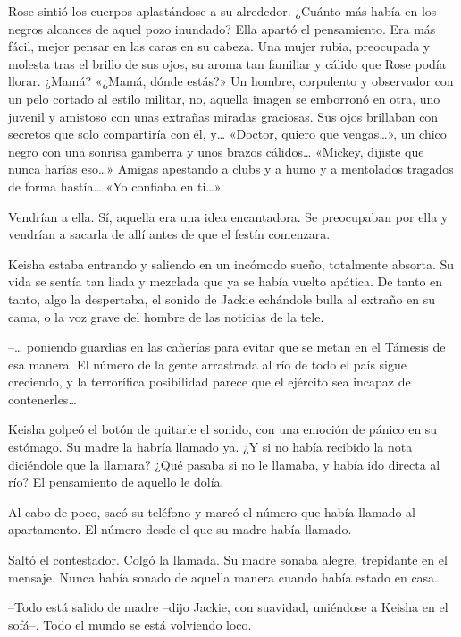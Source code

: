 {Rose sintió los cuerpos aplastándose a su alrededor. ¿Cuánto más había
 en los negros alcances de aquel pozo inundado? Ella apartó el
 pensamiento. Era más fácil, mejor pensar en las caras en su cabeza. Una
 mujer rubia, preocupada y molesta tras el brillo de sus ojos, su aroma
 tan familiar y cálido que Rose podía llorar. ¿Mamá? «¿Mamá, dónde
 estás?» Un hombre, corpulento y observador con un pelo cortado al estilo
 militar, no, aquella imagen se emborronó en otra, uno juvenil y amistoso
 con unas extrañas miradas graciosas. Sus ojos brillaban con secretos que
 solo compartiría con él, y\ldots{} «Doctor, quiero que vengas\ldots{}»,
 un chico negro con una sonrisa gamberra y unos brazos cálidos\ldots{}
 «Mickey, dijiste que nunca harías eso\ldots{}» Amigas apestando a clubs
 y a humo y a mentolados tragados de forma hastía\ldots{} «Yo confiaba en
 ti\ldots{}»}

{Vendrían a ella. Sí, aquella era una idea encantadora. Se preocupaban
por ella y vendrían a sacarla de allí antes de que el festín comenzara.}

\mbox{}

{Keisha estaba entrando y saliendo en un incómodo sueño, totalmente
 absorta. Su vida se sentía tan liada y mezclada que ya se había vuelto
 apática. De tanto en tanto, algo la despertaba, el sonido de Jackie
 echándole bulla al extraño en su cama, o la voz grave del hombre de las
noticias de la tele.}

{--\ldots{} poniendo guardias en las cañerías para evitar que se metan
 en el Támesis de esa manera. El número de la gente arrastrada al río de
 todo el país sigue creciendo, y la terrorífica posibilidad parece que el
 ejército sea incapaz de contenerles\ldots{}}

{Keisha golpeó el botón de quitarle el sonido, con una emoción de pánico
 en su estómago. Su madre la habría llamado ya. ¿Y si no había recibido
 la nota diciéndole que la llamara? ¿Qué pasaba si no le llamaba, y había
ido directa al río? El pensamiento de aquello le dolía.}

{Al cabo de poco, sacó su teléfono y marcó el número que había llamado
al apartamento. El número desde el que su madre había llamado.}

{Saltó el contestador. Colgó la llamada. Su madre sonaba alegre,
 trepidante en el mensaje. Nunca había sonado de aquella manera cuando
había estado en casa.}

{--Todo está salido de madre --dijo Jackie, con suavidad, uniéndose a
Keisha en el sofá--. Todo el mundo se está volviendo loco.}

